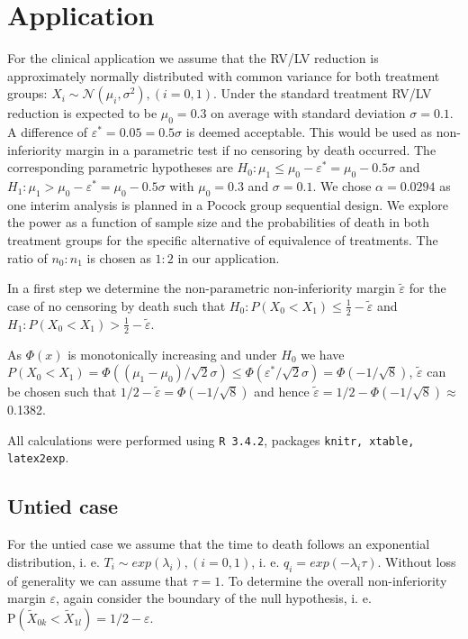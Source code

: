\documentclass[bimj,fleqn]{w-art}\usepackage[]{graphicx}\usepackage[]{color}
\theoremstyle{plain}
\theoremstyle{definition}
\begin{document}
\section{Application}
\label{sec:Application}
  For the clinical application we assume that the RV/LV reduction is approximately normally distributed
with common variance for both treatment groups:
$X_i \sim \mathcal{N} ( \mu_i, \sigma^2 ), (i = 0, 1)$. Under the standard treatment RV/LV reduction
is expected to be $\mu_0 = 0.3$ on average with standard deviation $\sigma= 0.1$. A difference of
$\varepsilon^{*} = 0.05 = 0.5 \sigma$ is deemed acceptable. This would be used as non-inferiority
margin in a parametric test if no censoring by death occurred. The corresponding parametric hypotheses
are $H_0: \mu_1 \leq \mu_0 - \varepsilon^{*}  = \mu_0 - 0.5 \sigma $ and
$H_1: \mu_1 > \mu_0 - \varepsilon^{*} = \mu_0 - 0.5 \sigma $ with $\mu_0 = 0.3$ and $\sigma = 0.1$.
We chose $\alpha = 0.0294$ as one interim analysis is planned in a Pocock group sequential design.
We explore the power as a function of sample size and the probabilities of death in
both treatment groups for the specific alternative of equivalence of treatments.
The ratio of $n_0 : n_1$ is chosen as $1 : 2 $ in our application.

In a first step we determine the non-parametric non-inferiority margin $\tilde{\varepsilon}$
for the case of no censoring by death such that
$H_0: P(X_0 < X_1) \leq \frac{1}{2} - \tilde{\varepsilon}$ and
$H_1: P(X_0 < X_1) >  \frac{1}{2} - \tilde{\varepsilon}$.

 As $\Phi(x)$ is monotonically increasing and under $H_0$ we have
 $P(X_0 < X_1) = \Phi((\mu_1 - \mu_0)/\sqrt{2}\sigma) \leq \Phi(\varepsilon^{*}/ \sqrt{2}\sigma) = \Phi(-1/\sqrt{8}) $,
 $\tilde{\varepsilon}$ can be chosen such that
 $1/2 - \tilde{\varepsilon} = \Phi(-1/\sqrt{8}) $ and hence
 $\tilde{\varepsilon} = 1/2 - \Phi(-1/\sqrt{8})  \approx $ 0.1382.

All calculations were performed using {\tt{R 3.4.2}}, packages {\tt{knitr, xtable, latex2exp}}.

\subsection{Untied case}
\label{sec:AppUntied}
For the untied case we assume that the time to death follows an exponential distribution, i. e.
$T_i \sim exp(\lambda_i), (i=0,1)$, i. e. $q_i = exp(-\lambda_i \tau)$. Without
loss of generality we can assume that $\tau = 1$. To determine the overall
non-inferiority margin $\varepsilon$, again consider the boundary of the null hypothesis,
i. e. $\text{P}(\widetilde{X}_{0k} < \widetilde{X}_{1l}) = 1/2 - \varepsilon $.
\end{document}
